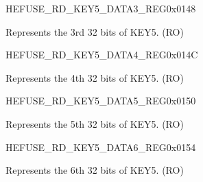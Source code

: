\begin{register}{H}{EFUSE\_RD\_KEY5\_DATA3\_REG}{0x0148}\label{regdesc:EFUSERDKEY5DATA3REG}
%
\regnewline%
\begin{regdesc}\begin{reglist}
\label{fielddesc:EFUSEKEY5DATA3}\item [EFUSE\_KEY5\_DATA3] Represents the 3rd 32 bits of KEY5. (RO)
\end{reglist}\end{regdesc}
\end{register}


\begin{register}{H}{EFUSE\_RD\_KEY5\_DATA4\_REG}{0x014C}\label{regdesc:EFUSERDKEY5DATA4REG}
%
\regnewline%
\begin{regdesc}\begin{reglist}
\label{fielddesc:EFUSEKEY5DATA4}\item [EFUSE\_KEY5\_DATA4] Represents the 4th 32 bits of KEY5. (RO)
\end{reglist}\end{regdesc}
\end{register}


\begin{register}{H}{EFUSE\_RD\_KEY5\_DATA5\_REG}{0x0150}\label{regdesc:EFUSERDKEY5DATA5REG}
%
\regnewline%
\begin{regdesc}\begin{reglist}
\label{fielddesc:EFUSEKEY5DATA5}\item [EFUSE\_KEY5\_DATA5] Represents the 5th 32 bits of KEY5. (RO)
\end{reglist}\end{regdesc}
\end{register}


\begin{register}{H}{EFUSE\_RD\_KEY5\_DATA6\_REG}{0x0154}\label{regdesc:EFUSERDKEY5DATA6REG}
%
\regnewline%
\begin{regdesc}\begin{reglist}
\label{fielddesc:EFUSEKEY5DATA6}\item [EFUSE\_KEY5\_DATA6] Represents the 6th 32 bits of KEY5. (RO)
\end{reglist}\end{regdesc}
\end{register}


